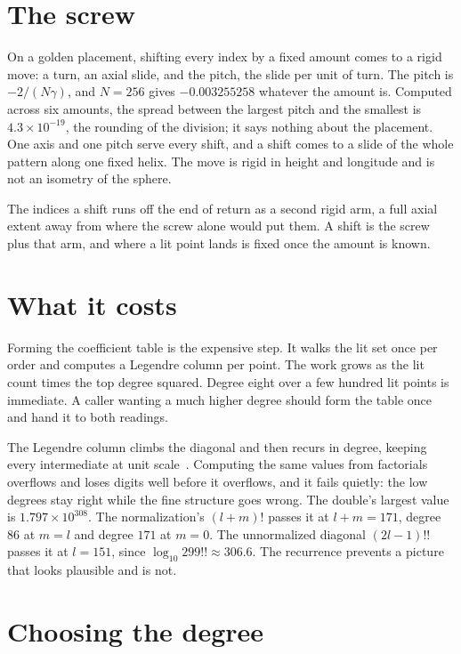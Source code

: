 \section{The screw}

On a golden placement, shifting every index by a fixed amount comes to a rigid move: a turn, an axial slide, and the pitch, the slide per unit of turn. The pitch is \(-2/(N\gamma)\), and \(N = 256\) gives \(-0.003255258\) whatever the amount is. Computed across six amounts, the spread between the largest pitch and the smallest is \(4.3 \times 10^{-19}\), the rounding of the division; it says nothing about the placement. One axis and one pitch serve every shift, and a shift comes to a slide of the whole pattern along one fixed helix. The move is rigid in height and longitude and is not an isometry of the sphere.

The indices a shift runs off the end of return as a second rigid arm, a full axial extent away from where the screw alone would put them. A shift is the screw plus that arm, and where a lit point lands is fixed once the amount is known.

\section{What it costs}

Forming the coefficient table is the expensive step. It walks the lit set once per order and computes a Legendre column per point. The work grows as the lit count times the top degree squared. Degree eight over a few hundred lit points is immediate. A caller wanting a much higher degree should form the table once and hand it to both readings.

The Legendre column climbs the diagonal and then recurs in degree, keeping every intermediate at unit scale~\cite{src:Holmes-and-Featherstone-2002}. Computing the same values from factorials overflows and loses digits well before it overflows, and it fails quietly: the low degrees stay right while the fine structure goes wrong. The double's largest value is \(1.797 \times 10^{308}\). The normalization's \((l+m)!\) passes it at \(l + m = 171\), degree \(86\) at \(m = l\) and degree \(171\) at \(m = 0\). The unnormalized diagonal \((2l-1)!!\) passes it at \(l = 151\), since \(\log_{10} 299!! \approx 306.6\). The recurrence prevents a picture that looks plausible and is not.

\section{Choosing the degree}

